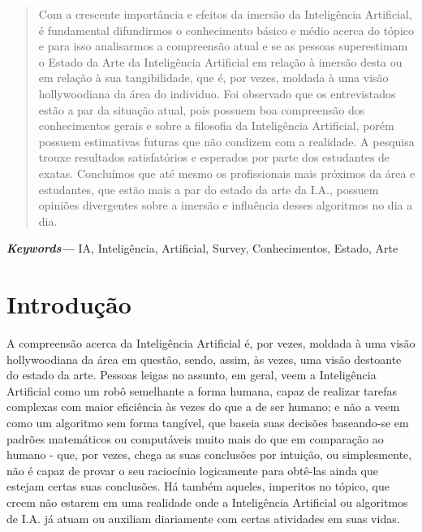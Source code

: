 \documentclass[onecolumn,12pt]{asme2ej}
\affiliation{PUCPR - Pontíficia Universidade Católica Paraná\\Ciência da Computação\\Email: joao.vitor.andrioli@pucpr.edu.br}}
\providecommand{\keywords}[1]{\small\textbf{\textit{Keywords---}} #1}
\begin{document}
\maketitle

\begin{abstract} 
{\it 

Com a crescente importância e efeitos da imersão da Inteligência Artificial, é fundamental difundirmos o conhecimento básico e médio acerca do tópico e para isso analisarmos a compreensão atual e se as pessoas superestimam o Estado da Arte da Inteligência Artificial em relação à imersão desta ou em relação à sua tangibilidade, que é, por vezes, moldada à uma visão hollywoodiana da área do individuo. Foi observado que os entrevistados estão a par da situação atual, pois possuem boa compreensão dos conhecimentos gerais e sobre a filosofia da Inteligência Artificial, porém possuem estimativas futuras que não condizem com a realidade. A pesquisa trouxe resultados satisfatórios e esperados por parte dos estudantes de exatas. Concluímos que até mesmo os profissionais mais próximos da área e estudantes, que estão mais a par do estado da arte da I.A., possuem opiniões divergentes sobre a imersão e influência desses algoritmos no dia a dia.

}
\end{abstract}
\keywords{IA, Inteligência, Artificial, Survey, Conhecimentos, Estado, Arte}

\section{Introdução} 

A compreensão acerca da Inteligência Artificial é, por vezes, moldada à uma visão hollywoodiana da área em questão, sendo, assim, às vezes, uma visão destoante do estado da arte. Pessoas leigas no assunto, em geral, veem a Inteligência Artificial como um robô semelhante a forma humana, capaz de realizar tarefas complexas com maior eficiência às vezes do que a de ser humano; e não a veem como um algoritmo sem forma tangível, que baseia suas decisões baseando-se em padrões matemáticos ou computáveis muito mais do que em comparação ao humano - que, por vezes, chega as suas conclusões por intuição, ou simplesmente, não é capaz de provar o seu raciocínio logicamente para obtê-las ainda que estejam certas suas conclusões. Há também aqueles, imperitos no tópico, que creem não estarem em uma realidade onde a Inteligência Artificial ou algoritmos de I.A. já atuam ou auxiliam diariamente com certas atividades em suas vidas.
\end{document}
